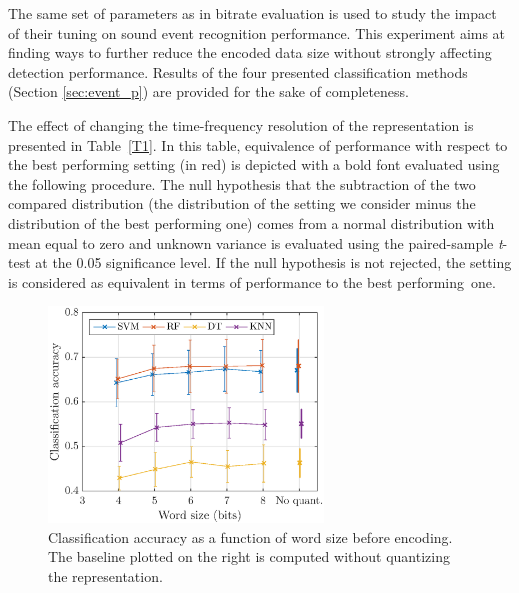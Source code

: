 \documentclass[sensors,article,accept,moreauthors,pdftex,10pt,a4paper]{mdpi}
\begin{document}
The same set of parameters as in bitrate evaluation is used to study the impact of their tuning on sound event recognition performance. This experiment aims at finding ways to further reduce the encoded data size without strongly affecting detection performance. Results of the four presented classification methods ({Section} \ref{sec:event_p}) are provided for the sake of completeness.%

The effect of changing the time-frequency resolution of the representation is presented in Table~\ref{T1}. In this table, equivalence of performance with respect to the best performing setting (in red) is depicted with a bold font evaluated using the following procedure. The null hypothesis that the subtraction of the two compared distribution (the distribution of the setting we consider minus the distribution of the best performing one) comes from a normal distribution with mean equal to zero and unknown variance is evaluated using the paired-sample \emph{t}-test at the 0.05 significance level. If the null hypothesis is not rejected, the setting is considered as equivalent in terms of performance to the best \mbox{performing one.}

\begin{figure}[H]
	\centering
		\includegraphics[width=0.65\textwidth]{figures/class_mel_q.eps}
	\caption{Classification accuracy as a function of word size before encoding. The baseline plotted on the right is computed without quantizing the representation.}
	\label{fig:class_mel_q}
\end{figure}
\end{document}
